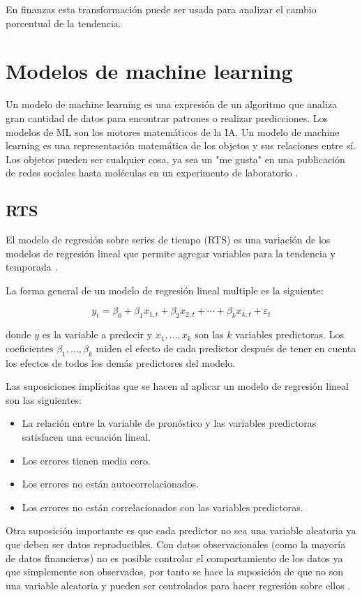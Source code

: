 En finanzas esta transformación puede ser usada para analizar el cambio porcentual de la tendencia.


\section{Modelos de machine learning}
\label{modelosmachinelearning}
Un modelo de machine learning es una expresión de un algoritmo que analiza gran cantidad de datos para encontrar patrones o realizar predicciones. Los modelos de ML son los motores matemáticos de la IA.
Un modelo de machine learning es una representación matemática de los objetos y sus relaciones entre sí. Los objetos pueden ser cualquier cosa, ya sea un "me gusta" en una publicación de redes sociales hasta moléculas en un experimento de laboratorio \cite{parsonsQueEsModelo2021}.

\subsection{RTS}
El modelo de regresión sobre series de tiempo (RTS) es una variación de los modelos de regresión lineal que permite agregar variables para la tendencia y temporada \cite{TslmFitLinear}. 

La forma general de un modelo de regresión lineal multiple es la siguiente:

\[
y_{t}=\beta_{0}+\beta_{1} x_{1, t}+\beta_{2} x_{2, t}+\cdots+\beta_{k} x_{k, t}+\varepsilon_{t}
\]

donde $y$ es la variable a predecir y $x_{1}, \ldots, x_{k}$ son las $k$ variables predictoras.
Los coeficientes $\beta_{1}, \ldots, \beta_{k}$ miden el efecto de cada predictor después de tener en cuenta los efectos de todos los demás predictores del modelo.

Las suposiciones implícitas que se hacen al aplicar un modelo de regresión lineal son las siguientes:

\begin{itemize}
\item La relación entre la variable de pronóstico y las variables predictoras satisfacen una ecuación lineal.
\item Los errores tienen media cero.
\item Los errores no están autocorrelacionados.
\item Los errores no están correlacionados con las variables predictoras.
\end{itemize}

Otra suposición importante es que cada predictor no sea una variable aleatoria ya que deben ser datos reproducibles. Con datos observacionales (como la mayoría de datos financieros) no es posible controlar el comportamiento de los datos ya que simplemente son observados, por tanto se hace la suposición de que no son una variable aleatoria y pueden ser controlados para hacer regresión sobre ellos \cite{hyndmanForecastingPrinciplesPractice}.

